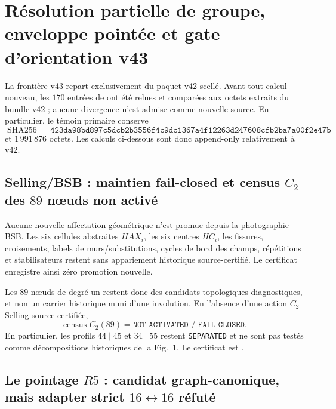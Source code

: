 \documentclass[11pt,a4paper]{article}
\newcommand{\certSeparated}{\texttt{SEPARATED}}
\begin{document}
\section{Résolution partielle de groupe, enveloppe pointée et gate d'orientation v43}

La frontière v43 repart exclusivement du paquet v42 scellé. Avant tout calcul nouveau, les $170$ entrées de  ont été relues et comparées aux octets extraits du bundle v42 ; aucune divergence n'est admise comme nouvelle source. En particulier, le témoin primaire  conserve
\[
 \operatorname{SHA256}=\texttt{423da98bd897c5dcb2b3556f4c9dc1367a4f12263d247608cfb2ba7a00f2e47b}
\]
et $1\,991\,876$ octets. Les calculs ci-dessous sont donc append-only relativement à v42.

\subsection{Selling/BSB : maintien fail-closed et census $C_2$ des $89$ nœuds non activé}

Aucune nouvelle affectation géométrique n'est promue depuis la photographie BSB. Les six cellules abstraites $HAX_i$, les six centres $HC_i$, les fissures, croisements, labels de murs/substitutions, cycles de bord des champs, répétitions et stabilisateurs restent sans appariement historique source-certifié. Le certificat  enregistre ainsi zéro promotion nouvelle.

Les $89$ nœuds de degré un restent donc des candidats topologiques diagnostiques, et non un carrier historique muni d'une involution. En l'absence d'une action $C_2$ Selling source-certifiée,
\[
 \boxed{\text{census }C_2(89)=\texttt{NOT-ACTIVATED / FAIL-CLOSED}.}
\]
En particulier, les profils $44\mid45$ et $34\mid55$ restent \certSeparated{} et ne sont pas testés comme décompositions historiques de la Fig.~1. Le certificat est .

\subsection{Le pointage $R5$ : candidat graph-canonique, mais adapter strict $16\leftrightarrow16$ réfuté}
\end{document}
